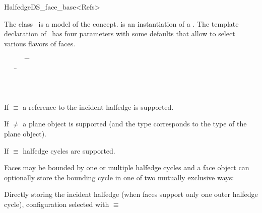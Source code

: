 
\ccRefPageBegin



\begin{ccRefClass}{HalfedgeDS_face_base<Refs>}
  
\ccDefinition
  
The class \ccRefName\ is a model of the 
concept.  is an instantiation of a .  The
template declaration of \ccRefName\ has {\XHDS four} parameters with some
defaults that allow to select various flavors of faces. 

{\XHDS

\begin{tabbing}
\mbox{}~~~~~~ \=  \=\\
              \> \> \mbox{}~~~ \=\\
              \> \> \>\\
              \> \> \>\\
     \> 
\end{tabbing}

If  $\equiv$  a reference to the incident halfedge is supported.

If  $\neq$  a plane object is supported (and the type  corresponds to the type of the plane object).

If  $\equiv$  halfedge cycles are supported.


Faces may be bounded by one or multiple halfedge cycles and a face object can optionally store the bounding cycle in one of two mutually exclusive ways: 

Directly storing the incident halfedge (when faces support only one outer halfedge cycle), configuration selected
with  $\equiv$ 

}
\end{ccRefClass}

